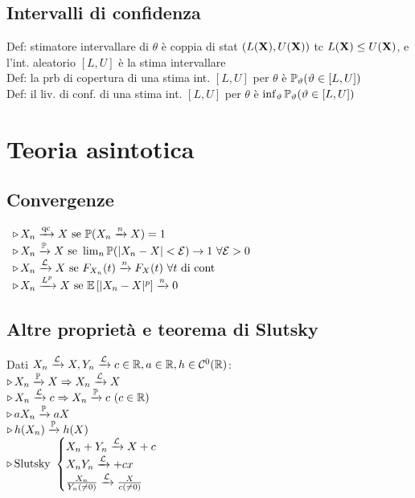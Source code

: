 \subsection{Intervalli di confidenza}

Def: stimatore intervallare  di $\theta$ è coppia di stat $(L(\mathbf{X}),U(\mathbf{X}))$ tc $L(\mathbf{X})\leq U(\mathbf{X})$, e l'int. aleatorio $[L,U]$ è la stima intervallare \\
Def: la prb di copertura di una stima int. $[L,U]$ per $\theta$ è $\mathbb{P}_\vartheta(\vartheta\in[L,U])$ \\
Def: il liv. di conf. di una stima int. $[L,U]$ per $\theta$ è $\inf_\vartheta\mathbb{P}_\vartheta(\vartheta\in[L,U])$


\newpage

\section{Teoria asintotica}


\subsection{Convergenze}

$\begin{array}{l}
\triangleright\,X_n\xrightarrow{\text{qc}}X\text{ se }\mathbb{P}(X_n\xrightarrow{n}X)=1 \\
\triangleright\,X_n\xrightarrow{\mathbb{P}}X\text{ se } \lim_{n}\mathbb{P}(|X_n-X|<\mathcal{E})\to 1\ \forall\mathcal{E}>0\\
\triangleright\,X_n\xrightarrow{\mathcal{L}}X\text{ se } F_{X_n}(t)\xrightarrow{n}F_X(t)\ \forall t\text{ di cont}\\
\triangleright\,X_n\xrightarrow{L^p}X\text{ se } \mathbb{E}\left[|X_n-X|^p\right]\xrightarrow{n} 0
\end{array}$



\subsection{Altre proprietà e teorema di Slutsky}

Dati $X_n\xrightarrow{\mathcal{L}}X,Y_n\xrightarrow{\mathcal{L}} c\in\mathbb{R},a\in\mathbb{R},h\in\mathcal{C}^0(\mathbb{R})$:\\
$\triangleright\,X_n\xrightarrow{\mathbb{P}}X\Rightarrow X_n\xrightarrow{\mathcal{L}} X$ \\
$\triangleright\,X_n\xrightarrow{\mathcal{L}}c\Rightarrow X_n\xrightarrow{\mathbb{P}}c\ (c\in\mathbb{R})$ \\
$\triangleright\,aX_n\xrightarrow{\mathbb{P}} aX$ \\
$\triangleright\,h(X_n)\xrightarrow{\mathbb{P}} h(X)$ \\
$\triangleright\,\text{Slutsky }
\begin{cases}
X_n+Y_n\xrightarrow{\mathcal{L}} X+c \\
X_nY_n\xrightarrow{\mathcal{L}} +cx \\
\frac{X_n}{Y_n(\neq 0)}\xrightarrow{\mathcal{L}} \frac{X}{c(\neq 0)}
\end{cases}$

